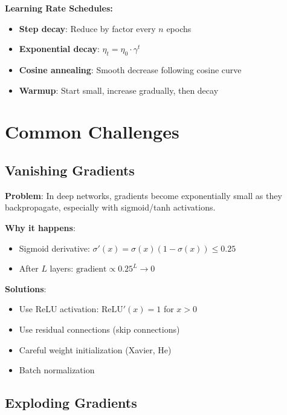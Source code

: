 \textbf{Learning Rate Schedules:}
\begin{itemize}
    \item \textbf{Step decay}: Reduce by factor every $n$ epochs
    \item \textbf{Exponential decay}: $\eta_t = \eta_0 \cdot \gamma^t$
    \item \textbf{Cosine annealing}: Smooth decrease following cosine curve
    \item \textbf{Warmup}: Start small, increase gradually, then decay
\end{itemize}

\section{Common Challenges}

\subsection{Vanishing Gradients}

\textbf{Problem}: In deep networks, gradients become exponentially small as they backpropagate, especially with sigmoid/tanh activations.

\textbf{Why it happens}:
\begin{itemize}
    \item Sigmoid derivative: $\sigma'(x) = \sigma(x)(1 - \sigma(x)) \leq 0.25$
    \item After $L$ layers: $\text{gradient} \propto 0.25^L \to 0$
\end{itemize}

\textbf{Solutions}:
\begin{itemize}
    \item Use ReLU activation: $\text{ReLU}'(x) = 1$ for $x > 0$
    \item Use residual connections (skip connections)
    \item Careful weight initialization (Xavier, He)
    \item Batch normalization
\end{itemize}

\subsection{Exploding Gradients}

